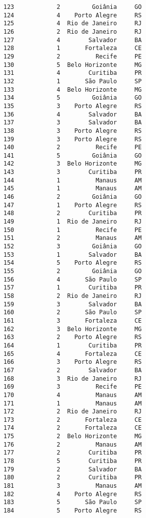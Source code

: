 \documentclass[11pt]{article}
\begin{document}
\begin{Verbatim}[commandchars=\\\{\}]
123            2         Goiânia     GO  
124            4    Porto Alegre     RS  
125            4  Rio de Janeiro     RJ  
126            2  Rio de Janeiro     RJ  
127            4        Salvador     BA  
128            1       Fortaleza     CE  
129            2          Recife     PE  
130            5  Belo Horizonte     MG  
131            4        Curitiba     PR  
132            1       São Paulo     SP  
133            4  Belo Horizonte     MG  
134            5         Goiânia     GO  
135            3    Porto Alegre     RS  
136            4        Salvador     BA  
137            3        Salvador     BA  
138            3    Porto Alegre     RS  
139            3    Porto Alegre     RS  
140            2          Recife     PE  
141            5         Goiânia     GO  
142            3  Belo Horizonte     MG  
143            3        Curitiba     PR  
144            1          Manaus     AM  
145            1          Manaus     AM  
146            2         Goiânia     GO  
147            1    Porto Alegre     RS  
148            2        Curitiba     PR  
149            1  Rio de Janeiro     RJ  
150            1          Recife     PE  
151            2          Manaus     AM  
152            3         Goiânia     GO  
153            1        Salvador     BA  
154            5    Porto Alegre     RS  
155            2         Goiânia     GO  
156            4       São Paulo     SP  
157            1        Curitiba     PR  
158            2  Rio de Janeiro     RJ  
159            3        Salvador     BA  
160            2       São Paulo     SP  
161            3       Fortaleza     CE  
162            3  Belo Horizonte     MG  
163            2    Porto Alegre     RS  
164            1        Curitiba     PR  
165            4       Fortaleza     CE  
166            3    Porto Alegre     RS  
167            2        Salvador     BA  
168            3  Rio de Janeiro     RJ  
169            3          Recife     PE  
170            4          Manaus     AM  
171            1          Manaus     AM  
172            2  Rio de Janeiro     RJ  
173            2       Fortaleza     CE  
174            2       Fortaleza     CE  
175            2  Belo Horizonte     MG  
176            2          Manaus     AM  
177            2        Curitiba     PR  
178            5        Curitiba     PR  
179            2        Salvador     BA  
180            2        Curitiba     PR  
181            3          Manaus     AM  
182            4    Porto Alegre     RS  
183            5       São Paulo     SP  
184            5    Porto Alegre     RS  

\end{Verbatim}
\end{document}
